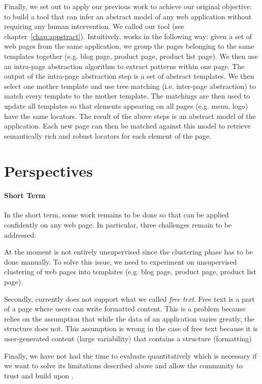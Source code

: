 Finally, we set out to apply our previous work to achieve our original objective: to build a tool that can infer an abstract model of any web application without requiring any human intervention.
We called our tool \appstract{} (see chapter~\ref{chap:appstract}).
Intuitively, \appstract{} works in the following way: given a set of web pages from the same application, we group the pages belonging to the same templates together (e.g. blog page, product page, product list page). We then use an intra-page abstraction algorithm to extract patterns within one page.
The output of the intra-page abstraction step is a set of abstract templates.
We then select one mother template and use tree matching (i.e. inter-page abstraction) to match every template to the mother template.
The matchings are then used to update all templates so that elements appearing on all pages (e.g. menu, logo) have the same locators.
The result of the above steps is an abstract model of the application.
Each new page can then be matched against this model to retrieve semantically rich and robust locators for each element of the page.

\section*{Perspectives}
\paragraph{Short Term}
In the short term, some work remains to be done so that \appstract{} can be applied confidently on any web page.
In particular, three challenges remain to be addressed:

At the moment \appstract{} is not entirely unsupervised since the clustering phase has to be done manually.
To solve this issue, we need to experiment on unsupervised clustering of web pages into templates
(e.g. blog page, product page, product list page).

Secondly, \appstract{} currently does not support what we called \textit{free text}.
Free text is a part of a page where users can write formatted content.
This is a problem because \appstract{} relies on the assumption that while the data of an application varies greatly, the structure does not. This assumption is wrong in the case of free text because it is user-generated content (large variability) that contains a structure (formatting)

Finally, we have not had the time to evaluate \appstract{} quantitatively which is necessary if we want to solve its limitations described above and allow the community to trust and build upon \appstract{}.

